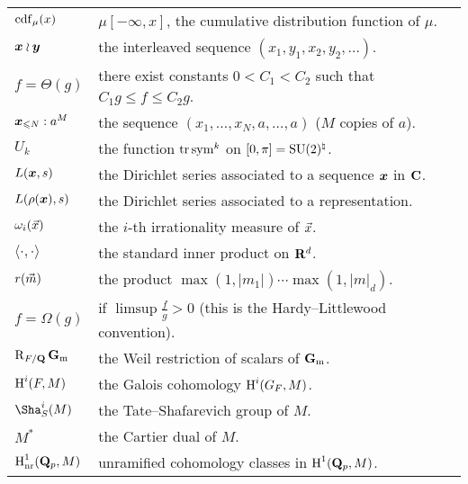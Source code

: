 \documentclass[phd,cornellheadings,tocprelim]{cornell}
\begin{document}
\begin{tabular}{ll}
$\operatorname{cdf}_\mu(x)$
	& $\mu[-\infty,x]$, the cumulative distribution function of $\mu$. \\	
${\boldsymbol x}\wr{\boldsymbol y}$
	& the interleaved sequence $(x_1,y_1,x_2,y_2,\dots)$. \\
$f = \Theta(g)$
	& there exist constants $0 < C_1 < C_2$ such that $C_1 g \leqslant f \leqslant C_2 g$. \\
${\boldsymbol x}_{\leqslant N} : a^M$
	& the sequence $(x_1,\dots,x_N,a,\dots,a)$ ($M$ copies of $a$). \\
$U_k$
	& the function $\operatorname{tr}\operatorname{sym}^k$ on $[0,\pi] = \operatorname{SU}(2)^\natural$. \\
$L({\boldsymbol x},s)$
	& the Dirichlet series associated to a sequence ${\boldsymbol x}$ in $\mathbf{C}$. \\
$L(\rho({\boldsymbol x}),s)$
	& the Dirichlet series associated to a representation. \\
$\omega_i(\vec{x})$
	& the $i$-th irrationality measure of $\vec{x}$. \\
$\langle \cdot,\cdot\rangle$
	& the standard inner product on $\mathbf{R}^d$. \\
$r(\vec{m})$
	& the product $\max(1,|m_1|) \cdots \max(1,|m|_d)$. \\
$f = \Omega(g)$
	& if $\limsup \frac f g > 0$ (this is the Hardy--Littlewood convention). \\
$\operatorname{R}_{F/\mathbf{Q}} \mathbf{G}_\mathrm{m}$
	& the Weil restriction of scalars of $\mathbf{G}_\mathrm{m}$. \\
$\operatorname{H}^i(F,M)$
	& the Galois cohomology $\operatorname{H}^i(G_F,M)$. \\
$\Sha^i_S(M)$
	& the Tate--Shafarevich group of $M$. \\
$M^\ast$
	& the Cartier dual of $M$. \\
$\operatorname{H}_{\mathrm{nr}}^1(\mathbf{Q}_p,M)$
	& unramified cohomology classes in $\operatorname{H}^1(\mathbf{Q}_p,M)$. 
\end{tabular}





\contentspage

\normalspacing
\setcounter{page}{1}
\pagestyle{cornell}
\addtolength{\parskip}{0.5\baselineskip}










\end{document}
